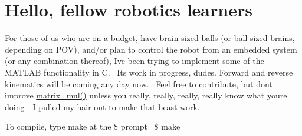 \section*{Hello, fellow robotics learners}

For those of us who are on a budget, have brain-\/sized balls (or ball-\/sized brains, depending on P\+OV), and/or plan to control the robot from an embedded system (or any combination thereof), I\textquotesingle{}ve been trying to implement some of the M\+A\+T\+L\+AB functionality in C.~\newline
 I\textquotesingle{}ts work in progress, dudes. Forward and reverse kinematics will be coming any day now.~\newline
 Feel free to contribute, but don\textquotesingle{}t improve \hyperlink{matrix_8c_a1e8d8c0421f716763d5bbb5c39af0e5b}{matrix\+\_\+mul()} unless you really, really, really, really know what you\textquotesingle{}re doing -\/ I pulled my hair out to make that beast work.

To compile, type make at the \$ prompt~\newline
 \$ make 